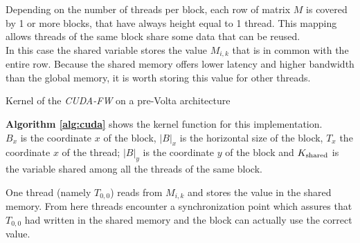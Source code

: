 Depending on the number of threads per block, each row  of matrix $M$ is covered by 1 or more blocks, that
have always height equal to 1 thread. This mapping allows threads of the same block share some data that can be reused. \\
In this case the shared variable stores the value $M_{i,k}$ that is in common with the entire row. Because the 
shared memory offers lower latency and higher bandwidth than the global memory, it is worth storing this value
for other threads.

\begin{algorithm}[h!]

\SetAlgoLined
\DontPrintSemicolon
  


\;

 
\caption{Kernel of the \emph{CUDA-FW} on a pre-Volta architecture}\label{alg:cuda}
\end{algorithm}

\textbf{Algorithm \ref*{alg:cuda}} shows the kernel function for this implementation. \\
$B_x$ is the coordinate $x$ of the block, $\left|B\right|_x$ is the horizontal size of the block, $T_x$ the 
coordinate $x$ of the thread; $\left|B\right|_y$ is the coordinate $y$ of the block and $K_{\textnormal{shared}}$ is the variable
shared among all the threads of the same block.

One thread (namely $T_{0,0}$) reads from $M_{i,k}$ and stores the value in the shared memory. From here threads encounter a synchronization point which
assures that $T_{0,0}$ had written in the shared memory and the block can actually use the correct value.

